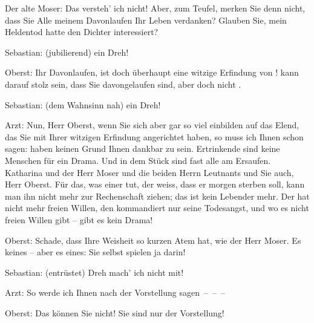 \pstart
           Der alte Moser: Das versteh’ ich nicht! Aber, zum Teufel, merken Sie denn nicht, dass
               Sie Alle meinem Davonlaufen Ihr Leben verdanken? Glauben Sie, mein Heldentod hatte
               den Dichter interessiert?\pend
           
\pstart
           Sebastian: (jubilierend)  ein Dreh!\pend
           
\pstart
           Oberst: Ihr Davonlaufen, ist doch überhaupt eine witzige Erfindung von !  kann darauf stolz sein,
               dass Sie davongelaufen sind, aber doch nicht .\pend
           
\pstart
           Sebastian: (dem Wahnsinn nah)  ein Dreh!\pend
           
\pstart
           Arzt: Nun, Herr Oberst, wenn Sie sich aber gar so viel einbilden auf das Elend, das
               Sie mit Ihrer witzigen Erfindung angerichtet haben, so muss ich Ihnen schon sagen:
                   haben keinen Grund Ihnen dankbar zu sein.
               Ertrinkende sind keine Menschen für ein Drama. Und in dem Stück sind fast alle am
               Ersaufen. Katharina und der Herr Moser und die beiden Herrn Leutnants und Sie auch,
               Herr Oberst. Für das, was einer tut, der weiss, dass er morgen {\pb}sterben soll, kann man ihn nicht
               mehr zur Rechenschaft ziehen; das ist kein Lebender mehr. Der hat nicht mehr freien
               Willen, den kommandiert nur seine Todesangst, und wo es nicht freien Willen gibt –
               gibt es kein Drama!\pend
           
\pstart
           Oberst: Schade, dass Ihre Weisheit so kurzen Atem hat, wie der Herr Moser. Es \label{T_L01900-3v}\label{T_L01900-3} keines – aber es \label{T_L01900-4v}\label{T_L01900-4} eines: Sie selbst spielen ja darin!\pend
           
\pstart
           Sebastian: (entrüstet)  Dreh mach’ ich nicht mit!\pend
           
\pstart
           Arzt: So werde ich Ihnen nach der Vorstellung sagen – – –\pend
           
\pstart
           Oberst: Das können Sie nicht! Sie sind nur  der
               Vorstellung!\pend
           
